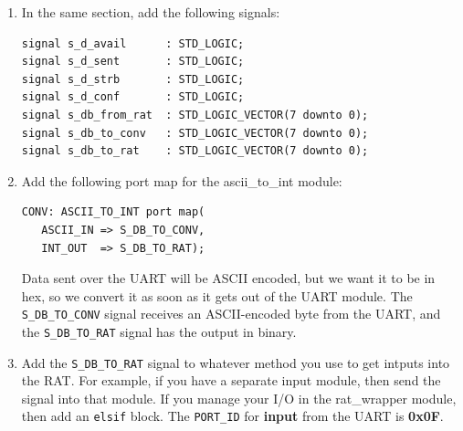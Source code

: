 \documentclass[notitlepage]{article}
\begin{document}
\begin {enumerate}
and for the ascii\_to\_int converter:
\begin{lstlisting}
component ascii_to_int
   Port(
      ascii_in : in     STD_LOGIC_VECTOR(7 downto 0);
      int_out  : out    STD_LOGIC_VECTOR(7 downto 0));
end component;
\end{lstlisting}

\item In the same section, add the following signals:
\begin{lstlisting}
signal s_d_avail      : STD_LOGIC;
signal s_d_sent       : STD_LOGIC;
signal s_d_strb       : STD_LOGIC;
signal s_d_conf       : STD_LOGIC;
signal s_db_from_rat  : STD_LOGIC_VECTOR(7 downto 0);
signal s_db_to_conv   : STD_LOGIC_VECTOR(7 downto 0);
signal s_db_to_rat    : STD_LOGIC_VECTOR(7 downto 0);
\end{lstlisting}

\item Add the following port map for the ascii\_to\_int module:
\begin{lstlisting}
CONV: ASCII_TO_INT port map(
   ASCII_IN => S_DB_TO_CONV,
   INT_OUT  => S_DB_TO_RAT);
\end{lstlisting}

Data sent over the UART will be ASCII encoded, but we want it to be in hex, so we convert it as soon as it gets out of the UART module. The \texttt{S\_DB\_TO\_CONV} signal receives an ASCII-encoded byte from the UART, and the \texttt{S\_DB\_TO\_RAT} signal has the output in binary.

\item Add the \texttt{S\_DB\_TO\_RAT} signal to whatever method you use to get intputs into the RAT. For example, if you have a  separate input module, then send the signal into that module. If you manage your I/O in the rat\_wrapper module, then add an \texttt{elsif} block. The \texttt{PORT\_ID} for \textbf{input} from the UART is \textbf{0x0F}.


\end{enumerate}
\end{document}

